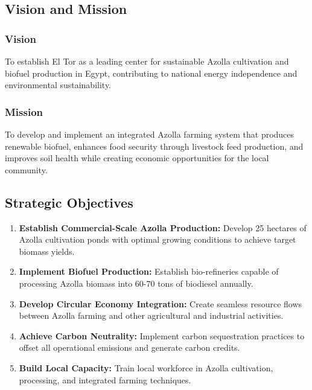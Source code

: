 \subsection{Vision and Mission}

\subsubsection{Vision}
To establish El Tor as a leading center for sustainable Azolla cultivation and biofuel production in Egypt, contributing to national energy independence and environmental sustainability.

\subsubsection{Mission}
To develop and implement an integrated Azolla farming system that produces renewable biofuel, enhances food security through livestock feed production, and improves soil health while creating economic opportunities for the local community.

\subsection{Strategic Objectives}

\begin{enumerate}
    \item \textbf{Establish Commercial-Scale Azolla Production:} Develop 25 hectares of Azolla cultivation ponds with optimal growing conditions to achieve target biomass yields.
    
    \item \textbf{Implement Biofuel Production:} Establish bio-refineries capable of processing Azolla biomass into 60-70 tons of biodiesel annually.
    
    \item \textbf{Develop Circular Economy Integration:} Create seamless resource flows between Azolla farming and other agricultural and industrial activities.
    
    \item \textbf{Achieve Carbon Neutrality:} Implement carbon sequestration practices to offset all operational emissions and generate carbon credits.
    
    \item \textbf{Build Local Capacity:} Train local workforce in Azolla cultivation, processing, and integrated farming techniques.
\end{enumerate}

